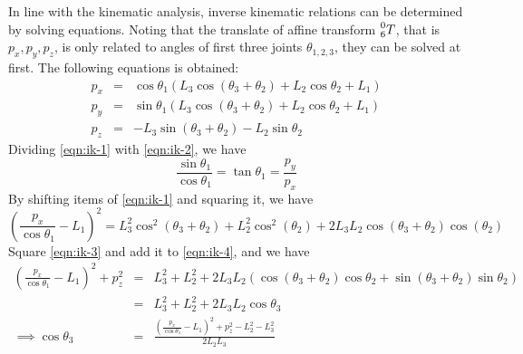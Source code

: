 \documentclass{article}
\begin{document}
In line with the kinematic analysis, inverse kinematic relations can be determined by solving equations.
Noting that the translate of affine transform $\prescript{0}{6}{T}$, that is $p_x, p_y, p_z$, is only related to angles of first three joints $\theta_{1,2,3}$, they can be solved at first.
The following equations is obtained:
\begin{eqnarray}
    \label{eqn:ik-1}
    p_x & = & \cos{\theta_1} \left( {L_3} \cos{\left( {{\theta }_3}+{{\theta }_2}\right) }+{L_2} \cos{\theta_2}+{L_1}\right) \\
    \label{eqn:ik-2}
    p_y & = & \sin{\theta_1} \left( {L_3} \cos{\left( {{\theta }_3}+{{\theta }_2}\right) }+{L_2} \cos{\theta_2}+{L_1}\right)  \\
    \label{eqn:ik-3}
    p_z & = & -{L_3} \sin{\left( {{\theta }_3}+{{\theta }_2}\right) } -{L_2} \sin{\theta_2}
\end{eqnarray}
Dividing \autoref{eqn:ik-1} with \autoref{eqn:ik-2}, we have
\begin{equation}
    \label{eqn:ik-theta-one}
    \frac{\sin \theta_1}{\cos \theta_1} = \tan \theta_1 = \frac{p_y}{p_x}
\end{equation}
By shifting items of \autoref{eqn:ik-1} and squaring it, we have
\begin{equation}
    \label{eqn:ik-4}
    \left( \frac{p_x}{\cos \theta_1} - L_1 \right)^2 =
    L_3^2 \cos^2(\theta_3 + \theta_2) + L_2^2 \cos^2 (\theta_2) + 2 L_3 L_2 \cos (\theta_3 + \theta_2) \cos (\theta_2)
\end{equation}
Square \autoref{eqn:ik-3} and add it to \autoref{eqn:ik-4}, and we have
\begin{eqnarray}
    \label{eqn:ik-theta-three}
    \left( \frac{p_x}{\cos \theta_1} - L_1 \right)^2 + p_z^2
    & = & L_3^2 + L_2^2 + 2 L_3 L_2 \left( \cos(\theta_3 + \theta_2) \cos \theta_2 + \sin(\theta_3 + \theta_2) \sin \theta_2 \right) \nonumber \\
    & = & L_3^2 + L_2^2 + 2 L_3 L_2 \cos \theta_3 \nonumber \\
    \implies \cos \theta_3 & = & \frac{\left( \frac{p_x}{\cos \theta_1} - L_1 \right)^2 + p_z^2 - L_2^2 - L_3^2}{2 L_2 L_3}
\end{eqnarray}
\end{document}
